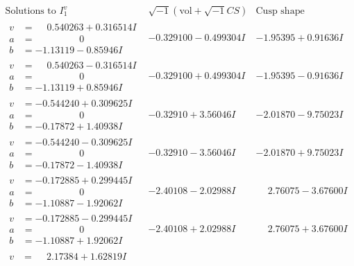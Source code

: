\documentclass[1p]{elsarticle_modified}
\theoremstyle{definition}
\newcommand{\I}{\sqrt{-1}}
\begin{document}
$$\begin{array}{c|c|c}  
\text{Solutions to }I^v_{1}& \I (\text{vol} + \sqrt{-1}CS) & \text{Cusp shape}\\
 \hline 
\begin{aligned}
v &= \phantom{-}0.540263 + 0.316514 I \\
a &= \phantom{-0.000000 } 0 \\
b &= -1.13119 - 0.85946 I\end{aligned}
 & -0.329100 - 0.499304 I & -1.95395 + 0.91636 I \\ \hline\begin{aligned}
v &= \phantom{-}0.540263 - 0.316514 I \\
a &= \phantom{-0.000000 } 0 \\
b &= -1.13119 + 0.85946 I\end{aligned}
 & -0.329100 + 0.499304 I & -1.95395 - 0.91636 I \\ \hline\begin{aligned}
v &= -0.544240 + 0.309625 I \\
a &= \phantom{-0.000000 } 0 \\
b &= -0.17872 + 1.40938 I\end{aligned}
 & -0.32910 + 3.56046 I & -2.01870 - 9.75023 I \\ \hline\begin{aligned}
v &= -0.544240 - 0.309625 I \\
a &= \phantom{-0.000000 } 0 \\
b &= -0.17872 - 1.40938 I\end{aligned}
 & -0.32910 - 3.56046 I & -2.01870 + 9.75023 I \\ \hline\begin{aligned}
v &= -0.172885 + 0.299445 I \\
a &= \phantom{-0.000000 } 0 \\
b &= -1.10887 - 1.92062 I\end{aligned}
 & -2.40108 - 2.02988 I & \phantom{-}2.76075 - 3.67600 I \\ \hline\begin{aligned}
v &= -0.172885 - 0.299445 I \\
a &= \phantom{-0.000000 } 0 \\
b &= -1.10887 + 1.92062 I\end{aligned}
 & -2.40108 + 2.02988 I & \phantom{-}2.76075 + 3.67600 I \\ \hline\begin{aligned}
v &= \phantom{-}2.17384 + 1.62819 I \\

\end{aligned}
\end{array}$$
\end{document}
